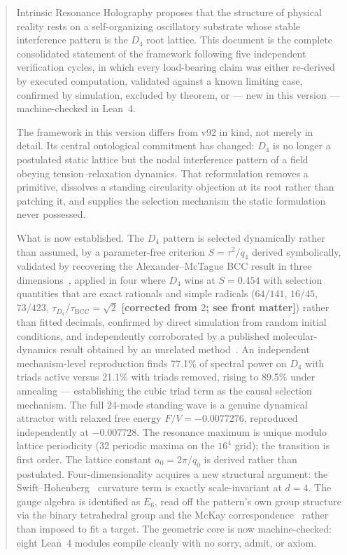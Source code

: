 \documentclass[11pt,a4paper]{article}
\begin{document}
\begin{abstract}
Intrinsic Resonance Holography proposes that the structure of physical reality rests on a self-organizing oscillatory substrate whose stable interference pattern is the $D_4$ root lattice. This document is the complete consolidated statement of the framework following five independent verification cycles, in which every load-bearing claim was either re-derived by executed computation, validated against a known limiting case, confirmed by simulation, excluded by theorem, or --- new in this version --- machine-checked in Lean~4.

The framework in this version differs from v92 in kind, not merely in detail. Its central ontological commitment has changed: $D_4$ is no longer a postulated static lattice but the nodal interference pattern of a field obeying tension--relaxation dynamics. That reformulation removes a primitive, dissolves a standing circularity objection at its root rather than patching it, and supplies the selection mechanism the static formulation never possessed.

What is now established. The $D_4$ pattern is selected dynamically rather than assumed, by a parameter-free criterion $S = \tau^2/q_4$ derived symbolically, validated by recovering the Alexander--McTague BCC result in three dimensions~\cite{alexander1978}, applied in four where $D_4$ wins at $S = 0.454$ with selection quantities that are exact rationals and simple radicals ($64/141$, $16/45$, $73/423$, $\tau_{D_4}/\tau_{\mathrm{BCC}} = \sqrt{2}$ \textbf{[corrected from $2$; see front matter]}) rather than fitted decimals, confirmed by direct simulation from random initial conditions, and independently corroborated by a published molecular-dynamics result obtained by an unrelated method~\cite{hoy2024}. An independent mechanism-level reproduction finds 77.1\% of spectral power on $D_4$ with triads active versus 21.1\% with triads removed, rising to 89.5\% under annealing --- establishing the cubic triad term as the causal selection mechanism. The full 24-mode standing wave is a genuine dynamical attractor with relaxed free energy $F/V = -0.0077276$, reproduced independently at $-0.007728$. The resonance maximum is unique modulo lattice periodicity (32 periodic maxima on the $16^4$ grid); the transition is first order. The lattice constant $a_0 = 2\pi/q_0$ is derived rather than postulated. Four-dimensionality acquires a new structural argument: the Swift--Hohenberg~\cite{swift1977} curvature term is exactly scale-invariant at $d = 4$. The gauge algebra is identified as $E_6$, read off the pattern's own group structure via the binary tetrahedral group and the McKay correspondence~\cite{mckay1980} rather than imposed to fit a target. The geometric core is now machine-checked: eight Lean~4 modules compile cleanly with no sorry, admit, or axiom.


\end{abstract}
\end{document}
